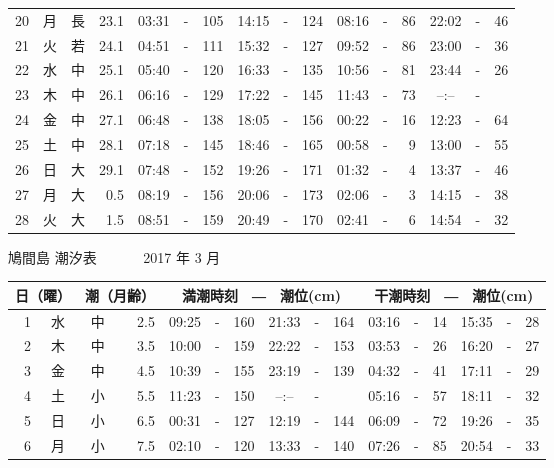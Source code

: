 \documentclass[12pt.a4j]{jsarticle}
\begin{document}
\begin{center}
\begin{table}[ht]
\begin{tabular}{|rc|cr|ccrccr|ccrccr|}
20 & 月 & 長 & 23.1 &  03:31 &-& 105  &  14:15 &-& 124  &   08:16 &-&  86  &   22:02 &-&  46  \\
21 & 火 & 若 & 24.1 &  04:51 &-& 111  &  15:32 &-& 127  &   09:52 &-&  86  &   23:00 &-&  36  \\
22 & 水 & 中 & 25.1 &  05:40 &-& 120  &  16:33 &-& 135  &   10:56 &-&  81  &   23:44 &-&  26  \\
23 & 木 & 中 & 26.1 &  06:16 &-& 129  &  17:22 &-& 145  &   11:43 &-&  73  &   --:-- &-&     \\
24 & 金 & 中 & 27.1 &  06:48 &-& 138  &  18:05 &-& 156  &   00:22 &-&  16  &   12:23 &-&  64  \\
25 & 土 & 中 & 28.1 &  07:18 &-& 145  &  18:46 &-& 165  &   00:58 &-&   9  &   13:00 &-&  55  \\
26 & 日 & 大 & 29.1 &  07:48 &-& 152  &  19:26 &-& 171  &   01:32 &-&   4  &   13:37 &-&  46  \\
27 & 月 & 大 &  0.5 &  08:19 &-& 156  &  20:06 &-& 173  &   02:06 &-&   3  &   14:15 &-&  38  \\
28 & 火 & 大 &  1.5 &  08:51 &-& 159  &  20:49 &-& 170  &   02:41 &-&   6  &   14:54 &-&  32  \\
   \hline
   \end{tabular}
\end{table}
\newpage
 {\LARGE 鳩間島  潮汐表　　　}
 {\large 2017 年  3 月}\\
 \begin{table}[ht]
    \begin{tabular}{|rc|cr|ccrccr|ccrccr|}
    \hline
    \multicolumn{2}{|c|}{日（曜）} & \multicolumn{2}{c|}{潮（月齢）} & \multicolumn{6}{c|}{満潮時刻　―　潮位(cm)} & \multicolumn{6}{c|}{干潮時刻　―　潮位(cm)} \\
 \hline
 1 & 水 & 中 &  2.5 &  09:25 &-& 160  &  21:33 &-& 164  &   03:16 &-&  14  &   15:35 &-&  28  \\
 2 & 木 & 中 &  3.5 &  10:00 &-& 159  &  22:22 &-& 153  &   03:53 &-&  26  &   16:20 &-&  27  \\
 3 & 金 & 中 &  4.5 &  10:39 &-& 155  &  23:19 &-& 139  &   04:32 &-&  41  &   17:11 &-&  29  \\
 4 & 土 & 小 &  5.5 &  11:23 &-& 150  &  --:-- &-&     &   05:16 &-&  57  &   18:11 &-&  32  \\
 5 & 日 & 小 &  6.5 &  00:31 &-& 127  &  12:19 &-& 144  &   06:09 &-&  72  &   19:26 &-&  35  \\
 6 & 月 & 小 &  7.5 &  02:10 &-& 120  &  13:33 &-& 140  &   07:26 &-&  85  &   20:54 &-&  33  \\

\end{tabular}
\end{table}
\end{center}
\end{document}
